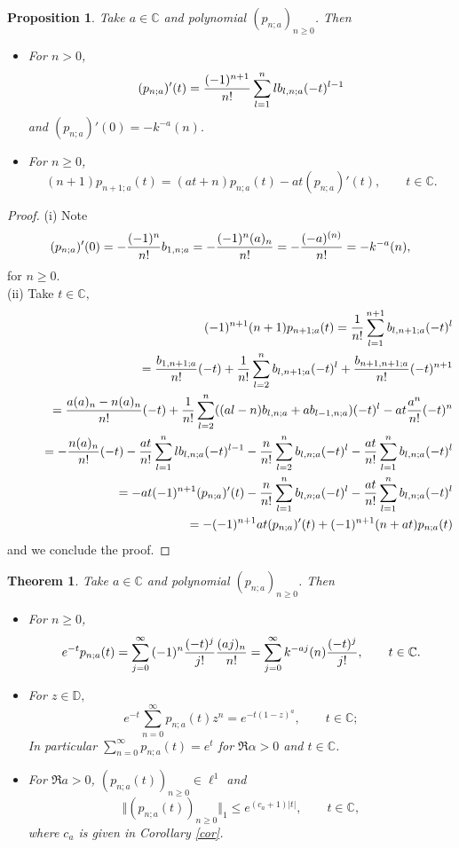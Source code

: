 \documentclass[a4paper,12pt]{amsart}
\def\CC{\mathbb C}
\def\CC{\mathbb C}
\def\DD{\mathbb D}
\newtheorem{proposition}[thm]{Proposition}
\newtheorem{theorem}[thm]{Theorem}
\theoremstyle{definition}
\theoremstyle{remark}
\begin{document}
\begin{proposition} Take $a\in \CC$ and polynomial $(p_{n;a})_{n\ge 0}$. Then
\begin{itemize}
\item[(i)] For $n>0$,
$$
(p_{n;a})'(t)={(-1)^{n{+1}}\over n!}\sum_{l=1}^n l b_{l,n;a}(-t)^{l-1}
$$
and $
 (p_{n;a})'(0)= -k^{-a}(n).
$
\item[(ii)]  For $n\ge 0$,
$$
(n+1)p_{n+1;a}(t)=(at+n)p_{n;a}(t){-}at(p_{n;a})'(t),\qquad t\in \CC.
$$
\end{itemize}
\end{proposition}

\begin{proof} (i) Note
$$
(p_{n;a})'(0)=-{(-1)^n\over n!}b_{1,n;a}=-{(-1)^n(a)_n\over n!}=-{(-a)^{(n)}\over n!}= -k^{-a}(n),
$$
for $n\ge 0.$\\
(ii) Take $t\in \CC,$
\begin{eqnarray*}
&\quad&(-1)^{n+1}(n+1)p_{n+1;a}(t)= {1\over n!}\sum_{l=1}^{n+1} b_{l,n+1;a}(-t)^l\\&\quad&\quad= {b_{1,n+1;a}\over n!}(-t)+{1\over n!}\sum_{l=2}^{n} b_{l,n+1;a}(-t)^l+ {b_{n+1,n+1;a}\over n!}(-t)^{n+1}\\
&\quad&\quad= {a(a)_{n}-n(a)_{n}\over n!}(-t)+{1\over n!}\sum_{l=2}^{n} ((a l-n)b_{l,n;a}+ab_{l-1,n;a})(-t)^l-at {a^{n}\over n!}(-t)^{n}\\
&\quad&\quad=  -{n(a)_{n}\over n!}(-t)-{at\over n!}\sum_{l=1}^{n} l b_{l,n;a}(-t)^{l-1}-{n\over n!}\sum_{l=2}^{n} b_{l,n;a}(-t)^{l}-{at\over n!}\sum_{l=1}^{n}
b_{l,n;a}(-t)^{l}\\
&\quad&\quad= -at(-1)^{n+1}(p_{n;a})'(t)-{n\over n!}\sum_{l=1}^{n} b_{l,n;a}(-t)^{l}-{at\over n!}\sum_{l=1}^{n}
b_{l,n;a}(-t)^{l}\\
&\quad&\quad= -(-1)^{n+1}at(p_{n;a})'(t)+(-1)^{n+1}{(n+at)} p_{n;a}(t)
\end{eqnarray*}
and we conclude the proof.
\end{proof}


\begin{theorem} \label{main2} Take $a\in \CC$ and polynomial $(p_{n;a})_{n\ge 0}$. Then
\begin{itemize}

    \item[(i)] For $n\ge 0$,
$$
e^{-t}p_{n;a}(t)= \sum_{j=0}^\infty {(-1)^{n}}{(-t)^{j}\over j!}{(aj)_n\over n!}= \sum_{j=0}^\infty k^{-aj}(n){(-t)^{j}\over j!}, \qquad t\in \CC.
$$


\item[(ii)] For $z\in \DD,$
$$
e^{-t}\sum_{n=0}^\infty p_{n;a}(t)z^n=e^{-t(1-z)^a}, \qquad t\in \CC;
$$
In particular $\displaystyle{\sum_{n=0}^\infty p_{n;a}(t)=e^t}$ for $\Re \alpha>0$ and $t\in \CC$.

\item[(iii)] For $\Re a>0$, $(p_{n;a}(t))_{n\ge 0}\in \ell^1$ and
$$
\Vert (p_{n;a}(t))_{n\ge 0}\Vert_1\le e^{(c_a+1)\vert t\vert}, \qquad t\in \CC,
$$
where $c_a $ is given in Corollary \ref{cor}.
\end{itemize}
\end{theorem}
\end{document}
